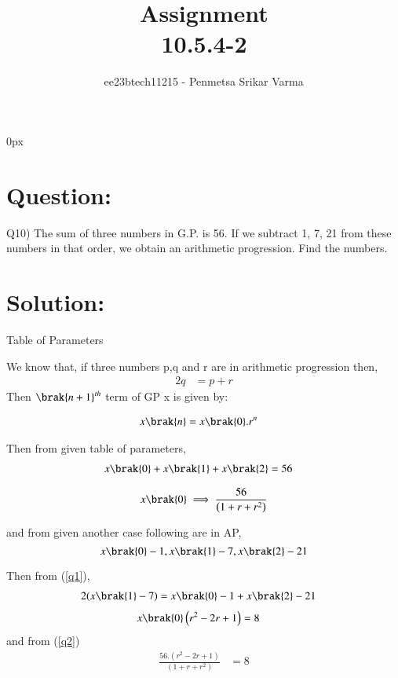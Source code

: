 \documentclass[beamer]{IEEEtran}
\theoremstyle{remark}
\begin{document}
\parindent 0px


\title{Assignment\\[1ex]10.5.4-2}
\author{ee23btech11215 - Penmetsa Srikar Varma$^{}$%
}
\maketitle
\newpage
\bigskip

\renewcommand{\thefigure}{\theenumi}
\renewcommand{\thetable}{\theenumi}
\section*{Question:}
Q10) The sum of three numbers in G.P. is 56. If we subtract 1, 7, 21 from these numbers in that order, we obtain an arithmetic progression. Find the numbers.
\section*{Solution:}
{\centering
Table of Parameters\\
}
\begin{table}[h]
    \centering
    
     \label{tab:t1}
\end{table}
We know that, if three numbers p,q and r are in arithmetic progression then,
\begin{align}
\label{q1}
2q &= p + r
\end{align}
Then $\brak{n+1}^{th}$ term of GP x is given by:

\begin{align}
\label{e1}
x\brak{n}&=x\brak{0}.r^{n}
\end{align}

Then from given table of parameters,
\begin{align}
x\brak{0}+x\brak{1}+x\brak{2}&=56
\end{align}

\begin{align}
\label{q2}
x\brak{0}\implies\frac{56}{\left(1+r+r^2\right)}
\end{align}

and from given another case following are in AP,
$$
x\brak{0}-1,x\brak{1}-7,x\brak{2}-21
$$

Then from (\ref{q1}),
\begin{align}2(x\brak{1}-7)&=x\brak{0}-1+x\brak{2}-21\end{align}
\begin{align}x\brak{0}\left(r^2-2r+1\right)&=8\end{align}
and from (\ref{q2})
\begin{align}\frac{56.\left(r^2-2r+1\right)}{\left(1+r+r^2\right)}&=8\end{align}
\end{document}
